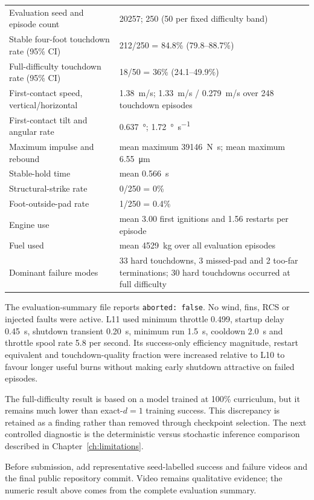 \begin{longtable}{p{}p{}}
  Evaluation seed and episode count & 20257; 250 (50 per fixed difficulty band) \\
  Stable four-foot touchdown rate (95\% CI) & 212/250 = 84.8\% (79.8--88.7\%) \\
  Full-difficulty touchdown rate (95\% CI) & 18/50 = 36\% (24.1--49.9\%) \\
  First-contact speed, vertical/horizontal & \SI{1.38}{m/s}; \SI{1.33}{m/s} / \SI{0.279}{m/s}
  over 248 touchdown episodes \\
  First-contact tilt and angular rate & \SI{0.637}{\degree}; \SI{1.72}{\degree\per\second} \\
  Maximum impulse and rebound & mean maximum \SI{39146}{\newton\second}; mean maximum
  \SI{6.55}{\micro\metre} \\
  Stable-hold time & mean \SI{0.566}{s} \\
  Structural-strike rate & 0/250 = 0\% \\
  Foot-outside-pad rate & 1/250 = 0.4\% \\
  Engine use & mean 3.00 first ignitions and 1.56 restarts per episode \\
  Fuel used & mean \SI{4529}{kg} over all evaluation episodes \\
  Dominant failure modes & 33 hard touchdowns, 3 missed-pad and 2 too-far terminations; 30 hard
  touchdowns occurred at full difficulty \\
  \bottomrule
\end{longtable}
\normalsize

The evaluation-summary file reports \texttt{aborted: false}. No wind, fins, RCS or injected
faults were active. L11 used minimum throttle 0.499, startup delay \SI{0.45}{s}, shutdown
transient \SI{0.20}{s}, minimum run \SI{1.5}{s}, cooldown \SI{2.0}{s} and throttle spool rate
5.8 per second. Its success-only efficiency magnitude, restart equivalent and touchdown-quality
fraction were increased relative to L10 to favour longer useful burns without making early
shutdown attractive on failed episodes.

The full-difficulty result is based on a model trained at 100\% curriculum, but it remains much
lower than exact-$d=1$ training success. This discrepancy is retained as a finding rather than
removed through checkpoint selection. The next controlled diagnostic is the deterministic versus
stochastic inference comparison described in Chapter~\ref{ch:limitations}.

Before submission, add representative seed-labelled success and failure videos and the final
public repository commit. Video remains qualitative evidence; the numeric result above comes
from the complete evaluation summary.
